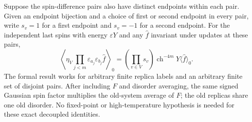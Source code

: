 \begin{lemma}\label{lem:sg-tal:hanen-spin-contraction}
\leanok
{}
Suppose the spin-difference pairs also have distinct endpoints within each pair.
Given an endpoint bijection and a choice of first or second endpoint in every
pair, write $s_v=1$ for a first endpoint and $s_v=-1$ for a second endpoint.
For the independent last spins with energy $\varepsilon Y$ and any $\hat f$
invariant under updates at these pairs,
\[
 \left\langle\eta_V\prod_{j<m}\varepsilon_{a_j}\varepsilon_{b_j}\hat f\right\rangle_0
 =\left(\prod_{v\in V}s_v\right)\operatorname{ch}^{-4m}Y\langle\hat f\rangle_0.
\]
The formal result works for arbitrary finite replica labels and an arbitrary
finite set of disjoint pairs. After including $F$ and disorder averaging, the
same signed Gaussian spin factor multiplies the old-system average of $F$;
the old replicas share one old disorder. No fixed-point or high-temperature
hypothesis is needed for these exact decoupled identities.
\end{lemma}

